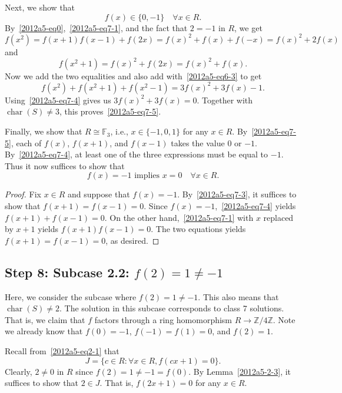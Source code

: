 \documentclass{article}
\newcommand{\F}{\mathbb{F}}
\newcommand{\Z}{\mathbb{Z}}
\DeclareMathOperator{\rchar}{char}
\begin{document}
Next, we show that
\[ f(x) \in \{0, -1\} \quad \forall x \in R. \tag{7.5}\label{2012a5-eq7-5} \]
By~\eqref{2012a5-eq0},~\eqref{2012a5-eq7-1}, and the fact that $2 = -1$ in $R$, we get
\[ f(x^2) = f(x + 1) f(x - 1) + f(2x) = f(x)^2 + f(x) + f(-x) = f(x)^2 + 2 f(x) \]
    and
\[ f(x^2 + 1) = f(x)^2 + f(2x) = f(x)^2 + f(x). \]
Now we add the two equalities and also add with~\eqref{2012a5-eq6-3} to get
\[ f(x^2) + f(x^2 + 1) + f(x^2 - 1) = 3 f(x)^2 + 3 f(x) - 1. \]
Using~\eqref{2012a5-eq7-4} gives us $3 f(x)^2 + 3 f(x) = 0$.
Together with $\rchar(S) \neq 3$, this proves~\eqref{2012a5-eq7-5}.

Finally, we show that $R \cong \F_3$, i.e., $x \in \{-1, 0, 1\}$ for any $x \in R$.
By~\eqref{2012a5-eq7-5}, each of $f(x)$, $f(x + 1)$, and $f(x - 1)$ takes the value $0$ or $-1$.
By~\eqref{2012a5-eq7-4}, at least one of the three expressions must be equal to $-1$.
Thus it now suffices to show that
\[ f(x) = -1 \text{ implies } x = 0 \quad \forall x \in R. \tag{7.6}\label{2012a5-eq7-6} \]

\begin{proof}
Fix $x \in R$ and suppose that $f(x) = -1$.
By~\eqref{2012a5-eq7-3}, it suffices to show that $f(x + 1) = f(x - 1) = 0$.
Since $f(x) = -1$,~\eqref{2012a5-eq7-4} yields $f(x + 1) + f(x - 1) = 0$.
On the other hand,~\eqref{2012a5-eq7-1} with $x$ replaced by $x + 1$ yields $f(x + 1) f(x - 1) = 0$.
The two equations yields $f(x + 1) = f(x - 1) = 0$, as desired.
\end{proof}









\subsection*{Step 8: Subcase 2.2: $f(2) = 1 \neq -1$}

Here, we consider the subcase where $f(2) = 1 \neq -1$.
This also means that $\rchar(S) \neq 2$.
The solution in this subcase corresponds to class 7 solutions.
That is, we claim that $f$ factors through a ring homomorphism $R \to \Z/4\Z$.
Note we already know that $f(0) = -1$, $f(-1) = f(1) = 0$, and $f(2) = 1$.

Recall from~\eqref{2012a5-eq2-1} that
\[ J = \{c \in R : \forall x \in R, f(cx + 1) = 0\}. \]
Clearly, $2 \neq 0$ in $R$ since $f(2) = 1 \neq -1 = f(0)$.
By Lemma~\ref{2012a5-2-3}, it suffices to show that $2 \in J$.
That is, $f(2x + 1) = 0$ for any $x \in R$.
\end{document}
